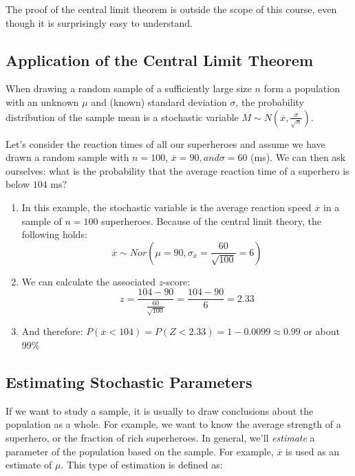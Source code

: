 The proof of the central limit theorem is outside the scope of this course, even though it is surprisingly easy to understand.

\subsection{Application of the Central Limit Theorem}
When drawing a random sample of a sufficiently large size $n$ form a population with an unknown $\mu$ and (known) standard deviation $\sigma$, the probability distribution of the sample mean is a stochastic variable $M \sim N (\overline{x}, \frac{\sigma}{\sqrt{n}})$.

\begin{example}
  Let's consider the reaction times of all our superheroes and assume we have drawn a random sample with $n = 100$, $\overline{x} = 90, and \sigma = 60$ (ms).
  We can then ask ourselves: what is the probability that the average reaction time of a superhero is below $104$ ms?

  \begin{enumerate}
    \item In this example, the stochastic variable is the average reaction speed $\overline{x}$ in a sample of $n=100$ superheroes. Because of the central limit theory, the following holds:
    \[ \overline{x} \sim Nor(\mu = 90, \sigma_{\overline{x}} = \frac{60}{\sqrt{100}} = 6) \]
    \item We can calculate the associated $z$-score:
    \[ z = \frac{104-90}{\frac{60}{\sqrt{100}}} = \frac{104-90}{6} = 2.33 \]
    \item And therefore: $P(\overline{x} < 104) = P(Z < 2.33) = 1 - 0.0099 \approx 0.99$ or about 99\%
  \end{enumerate}
\end{example}

\subsection{Estimating Stochastic Parameters}
\label{ssec:estimating-stochastic-parameters}

If we want to study a sample, it is usually to draw conclusions about the population as a whole. 
For example, we want to know the average strength of a superhero, or the fraction of rich superheroes. 
In general, we'll \emph{estimate} a parameter of the population based on the sample. For example, $\overline{x}$ is used as an estimate of $\mu$. This type of estimation is defined as:

